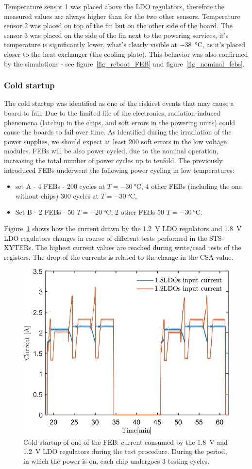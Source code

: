 Temperature sensor 1 was placed above the \gls{LDO} regulators, therefore the measured values are always higher than for the two other sensors. Temperature sensor 2 was placed on top of the fin but on the other side of the board. The sensor 3 was placed on the side of the fin next to the powering services, it's temperature is significantly lower, what's clearly visible at \SI{-38}{\celsius}, as it's placed closer to the heat exchanger (the cooling plate). This behavior was also confirmed by the simulations - see figure~\ref{fig_reboot_FEB} and figure~\ref{fig_nominal_febs}. 
\newpage

\subsubsection{Cold startup}
The cold startup was identified as one of the riskiest events that may cause a board to fail. Due to the limited life of the electronics, radiation-induced phenomena (latchup in the chips, and soft errors in the powering units) could cause the boards to fail over time.  As identified during the irradiation of the power supplies, we should expect at least 200 soft errors in the low voltage modules. \glspl{FEB} will be also power cycled, due to the nominal operation, increasing the total number of power cycles up to tenfold. The previously introduced \glspl{FEB} underwent the following power cycling in low temperatures:
\begin{itemize}
    \item set A - 4 \glspl{FEB} - 200 cycles at $T = \SI{-30}{\celsius}$, 4 other \glspl{FEB} (including the one without chips) 300 cycles at $T = \SI{-30}{\celsius}$,
    \item Set B - 2 \glspl{FEB} - 50 $T = \SI{-20}{\celsius}$, 2 other \glspl{FEB} 50 $T = \SI{-30}{\celsius}$.
\end{itemize}
Figure~\ref{fig_power_cycle} shows how the current drawn by the 1.2~V \gls{LDO} regulators and 1.8~V \gls{LDO} regulators changes in course of different tests performed in the STS-XYTERs. The highest current values are reached during write/read tests of the registers. The drop of the currents is related to the change in the \gls{CSA} value. 
\begin{figure}[!h]
\centering
\includegraphics[width=0.6\columnwidth]{Chapter4/images/currents.png}
\caption{Cold startup of one of the \gls{FEB}: current consumed by the 1.8~V and 1.2~V \gls{LDO} regulators during the test procedure. During the period, in which the power is on, each chip undergoes 3 testing cycles.}
\label{fig_power_cycle}
\end{figure}
\newpage
